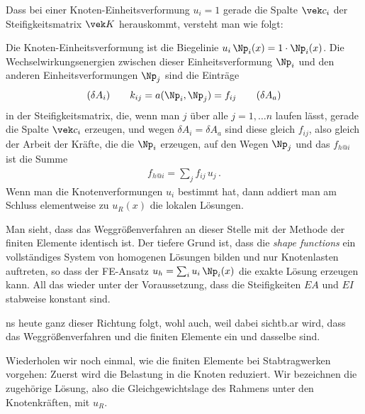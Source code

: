 {Dass bei einer Knoten-Einheitsverformung $u_i = 1$ gerade die Spalte $\vek c_i$ der Steifigkeitsmatrix $\vek K$ herauskommt, versteht man wie folgt:

Die Knoten-Einheitsverformung ist die Biegelinie $u_i\,\Np_i(x) = 1 \cdot \Np_i(x)$. Die Wechselwirkungsenergien zwischen dieser Einheitsverformung $\Np_i$ und den anderen Einheitsverformungen $\Np_j$ sind die Eintr\"{a}ge
\begin{align}
\text{($\delta A_i$)} \qquad k_{ij} = a(\Np_i,\Np_j) = f_{ij} \qquad \text{($\delta A_a$)}
\end{align}
in der Steifigkeitsmatrix, die, wenn man $j$ \"{u}ber alle $j = 1, \ldots n$ laufen l\"{a}sst, gerade die Spalte $\vek c_i$ erzeugen, und wegen $\delta A_i = \delta A_a$ sind diese gleich $f_{ij}$, also gleich der Arbeit der Kr\"{a}fte, die die $\Np_i$ erzeugen, auf den Wegen $\Np_j$ und das $f_{h @i}$ ist die Summe
\begin{align}
f_{h @i} = \sum_j f_{ij}\,u_j\,.
\end{align}
Wenn man die Knotenverformungen $u_i$ bestimmt hat, dann addiert man am Schluss elementweise zu $u_R(x)$ die lokalen L\"{o}sungen.


Man sieht, dass das Weggr\"{o}{\ss}enverfahren an dieser Stelle mit der Methode der finiten Elemente identisch ist.
Der tiefere Grund ist, dass die {\em shape functions\/} ein vollst\"{a}ndiges System von homogenen L\"{o}sungen bilden und nur Knotenlasten auftreten, so dass der FE-Ansatz $u_h = \sum_i u_i\,\Np_i(x)$ die exakte L\"{o}sung erzeugen kann. All das wieder unter der Voraussetzung, dass die Steifigkeiten $EA$ und $EI$ stabweise konstant sind.

ns heute ganz dieser Richtung folgt, wohl auch, weil dabei sichtb.ar wird, dass das Weggr\"{o}{\ss}enverfahren und die finiten Elemente ein und dasselbe sind.

Wiederholen wir noch einmal, wie die finiten Elemente bei Stabtragwerken vorgehen: Zuerst wird die Belastung in die Knoten reduziert. Wir bezeichnen die zugeh\"{o}rige L\"{o}sung, also die Gleichgewichtslage des Rahmens unter den Knotenkr\"{a}ften, mit $u_R$.

}

